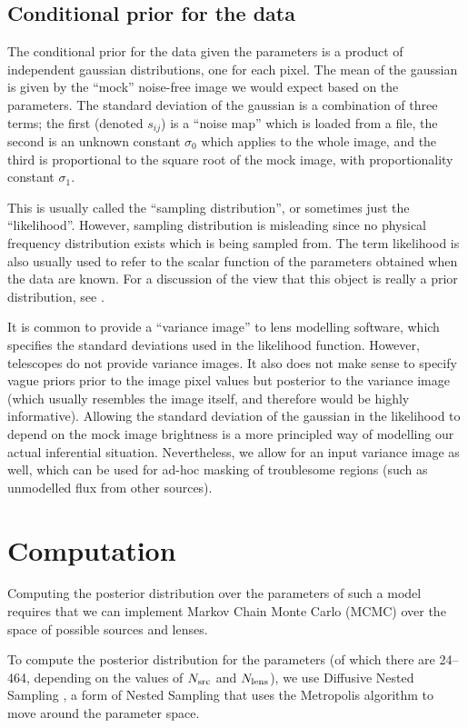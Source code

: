 \documentclass[useAMS,usenatbib]{mn2e}
\begin{document}
\subsection{Conditional prior for the data}
The conditional prior for the data given the parameters
is a product of independent gaussian distributions, one for each pixel.
The mean of the gaussian is given by the ``mock'' noise-free image we would
expect based on the parameters. The standard deviation of the gaussian is
a combination of three terms; the first (denoted $s_{ij}$) is a ``noise map''
which is loaded from a file, the second is an unknown constant $\sigma_0$
which applies to the whole image, and the third is proportional to the
square root of the mock image, with proportionality constant $\sigma_1$.

This is usually called the ``sampling distribution'', or sometimes just the
``likelihood''. However, sampling distribution is misleading since no
physical frequency distribution exists which is being sampled from. The term
likelihood is also usually used to refer to the scalar function of the parameters
obtained when the data are known. For a discussion of the view that this
object is really a prior distribution, see \citet[][pp. 33--35]{caticha}.

It is common to provide a ``variance image'' to lens modelling software,
which specifies the standard deviations used in the likelihood function.
However, telescopes do not provide variance images. It also does not make
sense to specify vague priors prior to the image pixel values but posterior to
the variance image (which usually resembles the image itself, and therefore
would be highly informative). Allowing the standard deviation of the gaussian in the
likelihood to depend on the mock image brightness is a more principled way
of modelling our actual inferential situation. Nevertheless, we allow for an
input variance image as well, which can be used for ad-hoc masking of
troublesome regions (such as unmodelled flux from other sources).

\section{Computation}
Computing the posterior distribution over the parameters of such a model
requires that we can implement Markov Chain Monte Carlo (MCMC) over the space
of possible sources and lenses.

To compute the posterior distribution for the parameters
(of which there are 24--464, depending on the values of $N_{\rm src}$ and
$N_{\rm lens}$), we use Diffusive Nested Sampling \citep{dnest}, a form
of Nested Sampling \citep{skilling} that uses the Metropolis algorithm
to move around the parameter space.
\end{document}
